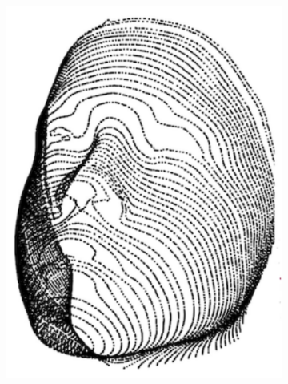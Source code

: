 \begin{figure}[h]
\begin{subfigure}[b]{0.32\textwidth}
		\includegraphics[width=\textwidth]{figures/resers_b.png}
		\caption{}
		\label{fig:resers:b}
	\end{subfigure}
	\hfill
	\begin{subfigure}[b]{0.32\textwidth}
		\centering

\end{subfigure}
\end{figure}
